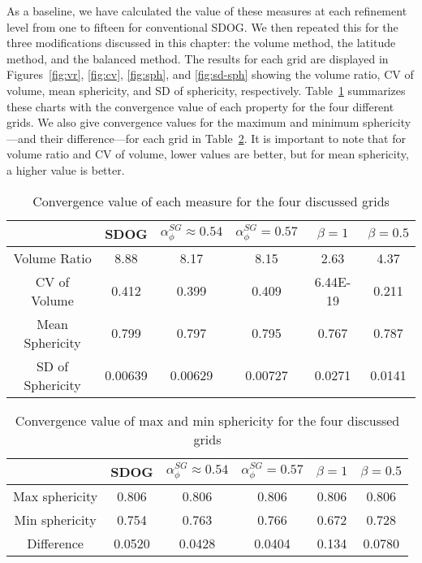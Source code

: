 As a baseline, we have calculated the value of these measures at each refinement level from one to fifteen for conventional SDOG.
We then repeated this for the three modifications discussed in this chapter: the volume method, the latitude method, and the balanced method.
The results for each grid are displayed in Figures~\ref{fig:vr}, \ref{fig:cv}, \ref{fig:sph}, and \ref{fig:sd-sph} showing the volume ratio, CV of volume, mean sphericity, and SD of sphericity, respectively.
Table~\ref{tab:results} summarizes these charts with the convergence value of each property for the four different grids.
We also give convergence values for the maximum and minimum sphericity---and their difference---for each grid in Table~\ref{tab:results-sph}.
It is important to note that for volume ratio and CV of volume, lower values are better, but for mean sphericity, a higher value is better.


\begin{table}[htp!]
	\centering
	\caption[Title]{
		Convergence value of each measure for the four discussed grids
	}
	\begin{tabular}{|c|c|c|c|c|c|}
		\hline
		& SDOG & $\alpha_{\phi}^{SG} \approx 0.54$ & $\alpha_{\phi}^{SG} = 0.57$ & $\beta = 1$ & $\beta = 0.5$ \\ \hline
		Volume Ratio     & 8.88   & 8.17   & 8.15   & 2.63      & 4.37   \\ \hline
		CV of Volume     & 0.412  & 0.399  & 0.409  & 6.44E-19  & 0.211  \\ \hline
		Mean Sphericity  & 0.799  & 0.797  & 0.795  & 0.767     & 0.787  \\ \hline
		SD of Sphericity & 0.00639& 0.00629& 0.00727& 0.0271    & 0.0141 \\ \hline
	\end{tabular}
	\label{tab:results}
\end{table}


\begin{table}[htp!]
	\centering
	\caption[Title]{
		Convergence value of max and min sphericity for the four discussed grids
	}
	\begin{tabular}{|c|c|c|c|c|c|}
		\hline
		& SDOG & $\alpha_{\phi}^{SG} \approx 0.54$ & $\alpha_{\phi}^{SG} = 0.57$ & $\beta = 1$ & $\beta = 0.5$ \\ \hline
		Max sphericity & 0.806  & 0.806  & 0.806  & 0.806 & 0.806  \\ \hline
		Min sphericity & 0.754  & 0.763  & 0.766  & 0.672 & 0.728  \\ \hline
		Difference     & 0.0520 & 0.0428 & 0.0404 & 0.134 & 0.0780 \\ \hline
	\end{tabular}
	\label{tab:results-sph}
\end{table}

